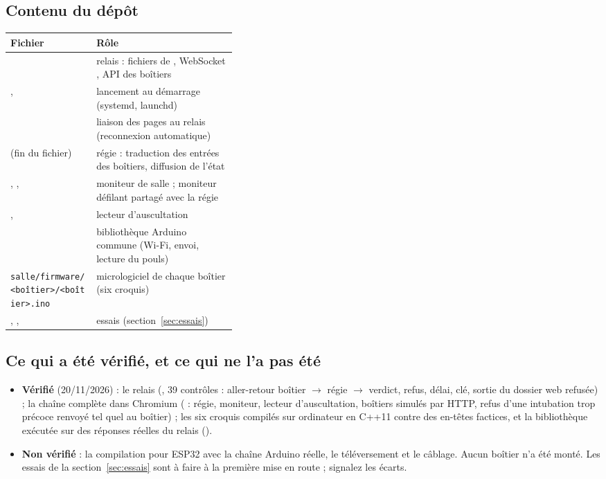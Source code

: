 \documentclass[11pt,a4paper]{article}
\begin{document}
\subsection{Contenu du dépôt}
\begin{tabularx}{\linewidth}{>{\raggedright\arraybackslash}p{0.38\linewidth}L}
\toprule
\textbf{Fichier} & \textbf{Rôle} \\
\midrule
{} & relais : fichiers de , WebSocket , API des boîtiers \\
,  & lancement au démarrage (systemd, launchd) \\
 & liaison des pages au relais (reconnexion automatique) \\
 (fin du fichier) & régie : traduction des entrées des boîtiers, diffusion de l'état \\
, ,  & moniteur de salle ; moniteur défilant partagé avec la régie \\
,  & lecteur d'auscultation \\
 & bibliothèque Arduino commune (Wi-Fi, envoi, lecture du pouls) \\
\texttt{salle/firmware/<boîtier>/}\allowbreak\texttt{<boîtier>.ino} & micrologiciel de chaque boîtier (six croquis) \\
, ,  & essais (section~\ref{sec:essais}) \\
\bottomrule
\end{tabularx}

\subsection{Ce qui a été vérifié, et ce qui ne l'a pas été}
\begin{itemize}
  \item \textbf{Vérifié} (20/11/2026) : le relais (, 39 contrôles : aller-retour boîtier
  \(\to\) régie \(\to\) verdict, refus, délai, clé, sortie du dossier web refusée) ; la chaîne complète dans Chromium
  ( : régie, moniteur, lecteur d'auscultation, boîtiers simulés par HTTP, refus d'une
  intubation trop précoce renvoyé tel quel au boîtier) ; les six croquis compilés sur ordinateur en C++11 contre
  des en-têtes factices, et la bibliothèque  exécutée sur des réponses réelles du relais
  ().
  \item \textbf{Non vérifié} : la compilation pour ESP32 avec la chaîne Arduino réelle, le téléversement et le
  câblage. Aucun boîtier n'a été monté. Les essais de la section~\ref{sec:essais} sont à faire à la première mise
  en route ; signalez les écarts.
\end{itemize}
\end{document}
